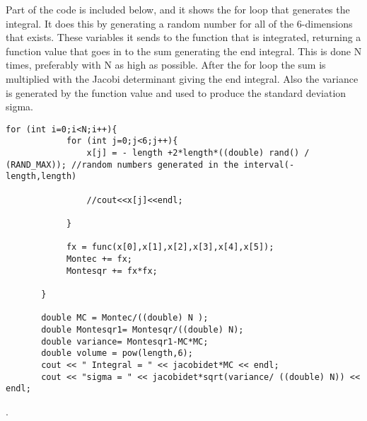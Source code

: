Part of the code is included below, and it shows the for loop that generates the integral. It does this by generating a random number for all of the 6-dimensions that exists. These variables it sends to the function that is integrated, returning a function value that goes in to the sum generating the end integral. This is done N times, preferably with N as high as possible. After the for loop the sum is multiplied with the Jacobi determinant giving the end integral. Also the variance is generated by the function value and used to produce the standard deviation sigma. 
  
\begin{lstlisting}
for (int i=0;i<N;i++){
            for (int j=0;j<6;j++){
                x[j] = - length +2*length*((double) rand() / (RAND_MAX)); //random numbers generated in the interval(-length,length)

                //cout<<x[j]<<endl;

            }

            fx = func(x[0],x[1],x[2],x[3],x[4],x[5]);
            Montec += fx;
            Montesqr += fx*fx;

       }

       double MC = Montec/((double) N );
       double Montesqr1= Montesqr/((double) N);
       double variance= Montesqr1-MC*MC;
       double volume = pow(length,6);
       cout << " Integral = " << jacobidet*MC << endl;
       cout << "sigma = " << jacobidet*sqrt(variance/ ((double) N)) << endl;

\end{lstlisting}


. 
